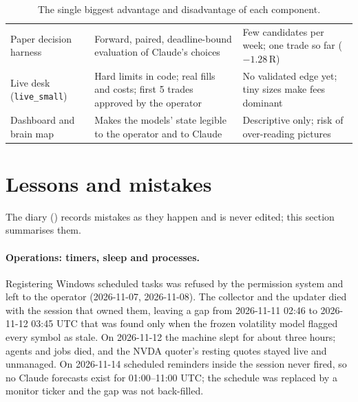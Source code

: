 \documentclass[10pt,a4paper]{article}
\begin{document}
\begin{table}[h]
\begin{tabularx}{\textwidth}{@{}p{3.0cm} L L@{}}
Paper decision harness & Forward, paired, deadline-bound evaluation of Claude's choices & Few candidates per week; one trade so far ($-1.28$\,R) \\
Live desk (\texttt{live\_small}) & Hard limits in code; real fills and costs; first 5 trades approved by the operator & No validated edge yet; tiny sizes make fees dominant \\
Dashboard and brain map & Makes the models' state legible to the operator and to Claude & Descriptive only; risk of over-reading pictures \\
\bottomrule
\end{tabularx}
\caption{The single biggest advantage and disadvantage of each component.}
\label{tab:proscons}
\end{table}

\section{Lessons and mistakes}
\label{sec:lessons}

The diary (\protect{}) records mistakes as they happen and is never edited; this section summarises them.

\paragraph{Operations: timers, sleep and processes.} Registering Windows scheduled tasks was refused by the permission system and left to the operator (2026-11-07, 2026-11-08). The collector and the updater died with the session that owned them, leaving a gap from 2026-11-11 02:46 to 2026-11-12 03:45 UTC that was found only when the frozen volatility model flagged every symbol as stale. On 2026-11-12 the machine slept for about three hours; agents and jobs died, and the NVDA quoter's resting quotes stayed live and unmanaged. On 2026-11-14 scheduled reminders inside the session never fired, so no Claude forecasts exist for 01:00--11:00 UTC; the schedule was replaced by a monitor ticker and the gap was not back-filled.
\end{document}
